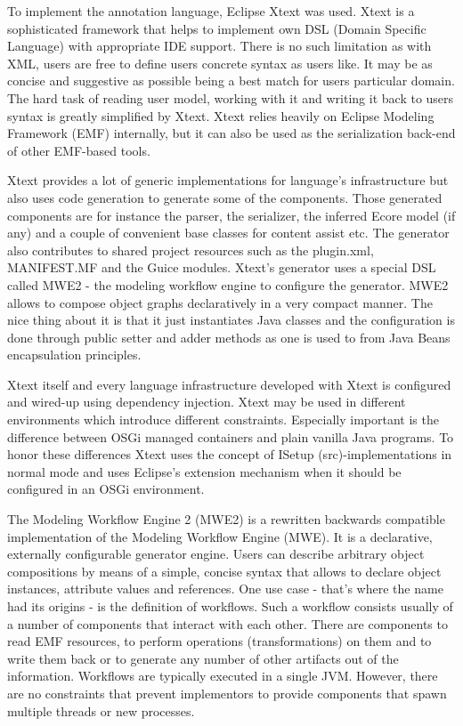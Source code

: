 To implement the annotation language, Eclipse Xtext \cite{ref_17_xtext:grammar} was used. Xtext is a sophisticated framework that helps to implement own DSL (Domain Specific Language) with appropriate IDE support. There is no such limitation as with XML, users are free to define users concrete syntax as users like. It may be as concise and suggestive as possible being a best match for users particular domain. The hard task of reading user model, working with it and writing it back to users syntax is greatly simplified by Xtext. Xtext relies heavily on Eclipse Modeling Framework (EMF) internally, but it can also be used as the serialization back-end of other EMF-based tools.  

Xtext provides a lot of generic implementations for language's infrastructure but also uses code generation to generate some of the components. Those generated components are for instance the parser, the serializer, the inferred Ecore model (if any) and a couple of convenient base classes for content assist etc. The generator also contributes to shared project resources such as the plugin.xml, MANIFEST.MF and the Guice modules. Xtext's generator uses a special DSL called MWE2 - the modeling workflow engine to configure the generator. MWE2 allows to compose object graphs declaratively in a very compact manner. The nice thing about it is that it just instantiates Java classes and the configuration is done through public setter and adder methods as one is used to from Java Beans encapsulation principles.

Xtext itself and every language infrastructure developed with Xtext is configured and wired-up using dependency injection. Xtext may be used in different environments which introduce different constraints. Especially important is the difference between OSGi managed containers and plain vanilla Java programs. To honor these differences Xtext uses the concept of ISetup (src)-implementations in normal mode and uses Eclipse's extension mechanism when it should be configured in an OSGi environment.

The Modeling Workflow Engine 2 (MWE2) is a rewritten backwards compatible implementation of the Modeling Workflow Engine (MWE). It is a declarative, externally configurable generator engine. Users can describe arbitrary object compositions by means of a simple, concise syntax that allows to declare object instances, attribute values and references. One use case - that's where the name had its origins - is the definition of workflows. Such a workflow consists usually of a number of components that interact with each other. There are components to read EMF resources, to perform operations (transformations) on them and to write them back or to generate any number of other artifacts out of the information. Workflows are typically executed in a single JVM. However, there are no constraints that prevent implementors to provide components that spawn multiple threads or new processes.

